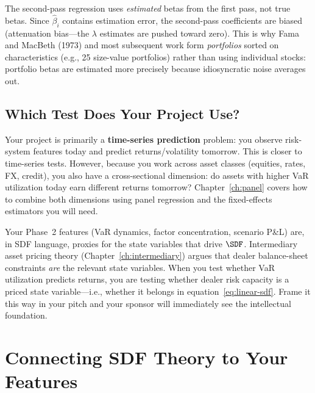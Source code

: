 \begin{warning}
The second-pass regression uses \emph{estimated} betas from the first pass, not true betas. Since $\hat{\beta}_i$ contains estimation error, the second-pass coefficients are biased (attenuation bias---the $\lambda$ estimates are pushed toward zero). This is why Fama and MacBeth (1973) and most subsequent work form \emph{portfolios} sorted on characteristics (e.g., 25 size-value portfolios) rather than using individual stocks: portfolio betas are estimated more precisely because idiosyncratic noise averages out.
\end{warning}

\subsection{Which Test Does Your Project Use?}

Your project is primarily a \textbf{time-series prediction} problem: you observe risk-system features today and predict returns/volatility tomorrow. This is closer to time-series tests. However, because you work across asset classes (equities, rates, FX, credit), you also have a cross-sectional dimension: do assets with higher VaR utilization today earn different returns tomorrow? Chapter~\ref{ch:panel} covers how to combine both dimensions using panel regression and the fixed-effects estimators you will need.

\begin{projectconnection}
Your Phase~2 features (VaR dynamics, factor concentration, scenario P\&L) are, in SDF language, proxies for the state variables that drive $\SDF$. Intermediary asset pricing theory (Chapter~\ref{ch:intermediary}) argues that dealer balance-sheet constraints \emph{are} the relevant state variables. When you test whether VaR utilization predicts returns, you are testing whether dealer risk capacity is a priced state variable---i.e., whether it belongs in equation~\eqref{eq:linear-sdf}. Frame it this way in your pitch and your sponsor will immediately see the intellectual foundation.
\end{projectconnection}

\section{Connecting SDF Theory to Your Features}
\label{sec:sdf-features}

